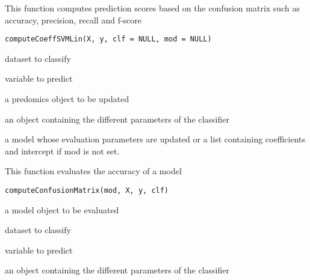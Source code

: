 \documentclass[a4paper]{book}
\begin{document}
%
\begin{Description}
This function computes prediction scores based on the confusion matrix such as accuracy, precision, recall and f-score
\end{Description}
%
\begin{Usage}
\begin{verbatim}
computeCoeffSVMLin(X, y, clf = NULL, mod = NULL)
\end{verbatim}
\end{Usage}
%
\begin{Arguments}
\begin{ldescription}
\item[\code{X:}] dataset to classify

\item[\code{y:}] variable to predict

\item[\code{mod:}] a predomics object to be updated

\item[\code{clf:}] an object containing the different parameters of the classifier
\end{ldescription}
\end{Arguments}
%
\begin{Value}
a model whose evaluation parameters are updated or a list containing coefficients and intercept if mod is not set.
\end{Value}
%
\begin{Description}
This function evaluates the accuracy of a model
\end{Description}
%
\begin{Usage}
\begin{verbatim}
computeConfusionMatrix(mod, X, y, clf)
\end{verbatim}
\end{Usage}
%
\begin{Arguments}
\begin{ldescription}
\item[\code{mod:}] a model object to be evaluated

\item[\code{X:}] dataset to classify

\item[\code{y:}] variable to predict

\item[\code{clf:}] an object containing the different parameters of the classifier
\end{ldescription}
\end{Arguments}
\end{document}
